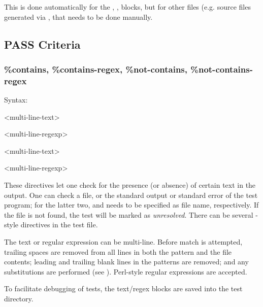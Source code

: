 This is done automatically for the , ,
 blocks, but for other files (e.g. source files generated
via , that needs to be done manually.


\subsection{PASS Criteria}
\label{sec:testing:opptest:pass-criteria}

\subsubsection{\%contains, \%contains-regex, \%not-contains, \%not-contains-regex}
\label{sec:testing:opptest:contains-and-co}

Syntax:

\begin{filelisting}
<multi-line-text>
\end{filelisting}

\begin{filelisting}
<multi-line-regexp>
\end{filelisting}

\begin{filelisting}
<multi-line-text>
\end{filelisting}

\begin{filelisting}
<multi-line-regexp>
\end{filelisting}

These directives let one check for the presence (or absence) of certain text in
the output. One can check a file, or the standard output or standard error of
the test program; for the latter two,  and  needs to be
specified as file name, respectively. If the file is not found, the test will be marked
as \textit{unresolved}. There can be several -style directives
in the test file.

The text or regular expression can be multi-line. Before match is attempted,
trailing spaces are removed from all lines in both the pattern and the
file contents; leading and trailing blank lines in the patterns are removed;
and any substitutions are performed (see ). Perl-style regular
expressions are accepted.

To facilitate debugging of tests, the text/regex blocks are saved into
the test directory.


